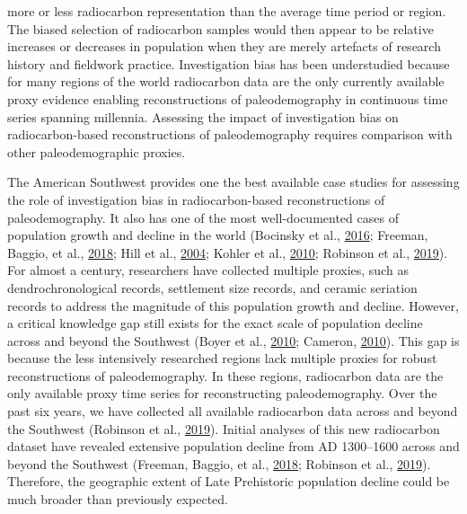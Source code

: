 \documentclass[
]{sa}
\begin{document}
more or less radiocarbon representation than the average time period or region. The biased selection of radiocarbon samples would then appear to be relative increases or decreases in population when they are merely artefacts of research history and fieldwork practice. Investigation bias has been understudied because for many regions of the world radiocarbon data are the only currently available proxy evidence enabling reconstructions of paleodemography in continuous time series spanning millennia. Assessing the impact of investigation bias on radiocarbon-based reconstructions of paleodemography requires comparison with other paleodemographic proxies.

The American Southwest provides one the best available case studies for assessing the role of investigation bias in radiocarbon-based reconstructions of paleodemography. It also has one of the most well-documented cases of population growth and decline in the world (Bocinsky et al., \protect\hyperlink{ref-Bocinsky2016}{2016}; Freeman, Baggio, et al., \protect\hyperlink{ref-Freeman2018PNAS}{2018}; Hill et al., \protect\hyperlink{ref-Hill2004}{2004}; Kohler et al., \protect\hyperlink{ref-Kohler2010b}{2010}; Robinson et al., \protect\hyperlink{ref-Robinson2019}{2019}). For almost a century, researchers have collected multiple proxies, such as dendrochronological records, settlement size records, and ceramic seriation records to address the magnitude of this population growth and decline. However, a critical knowledge gap still exists for the exact scale of population decline across and beyond the Southwest (Boyer et al., \protect\hyperlink{ref-Boyer2010}{2010}; Cameron, \protect\hyperlink{ref-Cameron2010}{2010}). This gap is because the less intensively researched regions lack multiple proxies for robust reconstructions of paleodemography. In these regions, radiocarbon data are the only available proxy time series for reconstructing paleodemography. Over the past six years, we have collected all available radiocarbon data across and beyond the Southwest (Robinson et al., \protect\hyperlink{ref-Robinson2019}{2019}). Initial analyses of this new radiocarbon dataset have revealed extensive population decline from AD 1300--1600 across and beyond the Southwest (Freeman, Baggio, et al., \protect\hyperlink{ref-Freeman2018PNAS}{2018}; Robinson et al., \protect\hyperlink{ref-Robinson2019}{2019}). Therefore, the geographic extent of Late Prehistoric population decline could be much broader than previously expected.
\end{document}
